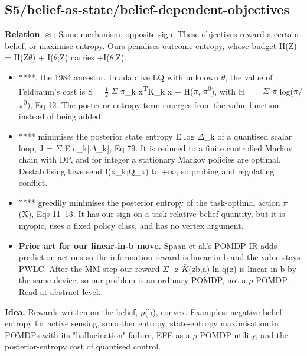 \documentclass[10pt]{article}
\begin{document}
\subsection{S5/belief-as-state/belief-dependent-objectives}\label{node:S5-S5-belief-as-state-belief-dependent-objectives}
\textbf{Relation} $\approx$: Same mechanism, opposite sign. These objectives reward a certain belief, or maximise entropy. Ours penalises outcome entropy, whose budget H(Z) = H(Z\textbar{}\ensuremath{\theta}) + I(\ensuremath{\theta};Z) carries +I(\ensuremath{\theta};Z).
\begin{itemize}[nosep,leftmargin=1.2em]
\item **\citet{Hijab-entropy84}**, the 1984 ancestor. In adaptive LQ with unknown \ensuremath{\theta}, the value of Feldbaum's cost is S = \ensuremath{\tfrac12} \ensuremath{\Sigma} \ensuremath{\pi}\_k x\textsuperscript{T}K\_k x + H(\ensuremath{\pi}, \ensuremath{\pi}\textsuperscript{0}), with H = \ensuremath{-}\ensuremath{\Sigma} \ensuremath{\pi} log(\ensuremath{\pi}/\ensuremath{\pi}\textsuperscript{0}), Eq 12. The posterior-entropy term emerges from the value function instead of being added.
\item **\citet{Feng-active97}** minimises the posterior state entropy E log \ensuremath{\Delta}\_k of a quantised scalar loop, J = \ensuremath{\Sigma} E c\_k[\ensuremath{\Delta}\_k], Eq 79. It is reduced to a finite controlled Markov chain with DP, and for integer a stationary Markov policies are optimal. Destabilising laws send I(x\_k;Q\_k) to +\ensuremath{\infty}, so probing and regulating conflict.
\item **\citet{Greigarn-taskoriented19}** greedily minimises the posterior entropy of the task-optimal action \ensuremath{\pi}(X), Eqs 11--13. It has our sign on a task-relative belief quantity, but it is myopic, uses a fixed policy class, and has no vertex argument.
\item \textbf{Prior art for our linear-in-b move.} Spaan et al.'s POMDP-IR adds prediction actions so the information reward is linear in b and the value stays PWLC. After the MM step our reward \ensuremath{\Sigma}\_z \ensuremath{\bar{K}}(z\textbar{}b,a) ln q(z) is linear in b by the same device, so our problem is an ordinary POMDP, not a \ensuremath{\rho}-POMDP. Read at abstract level.
\end{itemize}


\textbf{Idea.} Rewards written on the belief, \ensuremath{\rho}(b), convex. Examples: negative belief entropy for active sensing, smoother entropy, state-entropy maximisation in POMDPs with its "hallucination" failure, EFE as a \ensuremath{\rho}-POMDP utility, and the posterior-entropy cost of quantised control.
\end{document}
